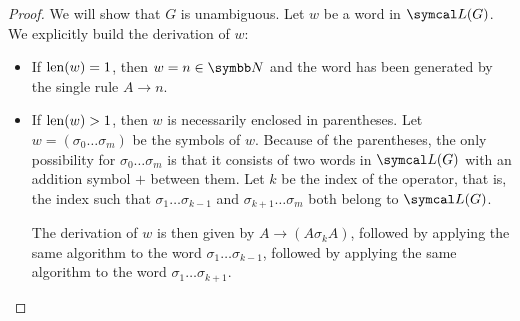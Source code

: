 \begin{proof}
  We will show that \( G \) is unambiguous. Let \( w \) be a word in \( \Cal{L}(G) \). We explicitly build the derivation of \( w \):
  \begin{itemize}
    \item If \( \operatorname{len}(w) = 1 \), then \( w = n \in \BN \) and the word has been generated by the single rule \( A \to n \).
    \item If \( \operatorname{len}(w) > 1 \), then \( w \) is necessarily enclosed in parentheses. Let \( w = ( \sigma_0 \ldots \sigma_m ) \) be the symbols of \( w \). Because of the parentheses, the only possibility for \( \sigma_0 \ldots \sigma_m \) is that it consists of two words in \( \Cal{L}(G) \) with an addition symbol \( + \) between them. Let \( k \) be the index of the operator, that is, the index such that \( \sigma_1 \ldots \sigma_{k-1} \) and \( \sigma_{k+1} \ldots \sigma_m \) both belong to \( \Cal{L}(G) \).

    The derivation of \( w \) is then given by \( A \to (A \sigma_k A) \), followed by applying the same algorithm to the word \( \sigma_1 \ldots \sigma_{k-1} \), followed by applying the same algorithm to the word \( \sigma_1 \ldots \sigma_{k+1} \).
  \end{itemize}
\end{proof}
